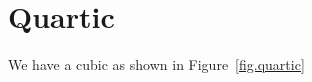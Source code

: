 \section{Quartic}
\label{sec.quartic}



\lipsum[9-10] %


We have a cubic as shown in Figure~\ref{fig.quartic}

